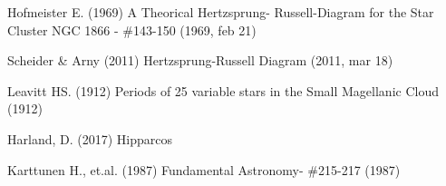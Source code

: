 \twocolumn

\begin{thebibliography}

  \bibitem[Hofmeister(1969)]{} Hofmeister E. (1969) A Theorical Hertzsprung- Russell-Diagram for the Star Cluster NGC 1866 - \#143-150  (1969, feb 21)

   Scheider \& Arny (2011) Hertzsprung-Russell Diagram (2011, mar 18)

  \bibitem[Leavitt(1912)]{} Leavitt HS. (1912) Periods of 25 variable stars in the Small Magellanic Cloud (1912)

  \bibitem[Harland(2016)]{} Harland, D. (2017) Hipparcos

  \bibitem[Karttunen et.al.(1987)]{} Karttunen H., et.al. (1987) Fundamental Astronomy- \#215-217  (1987)

\end{thebibliography}
